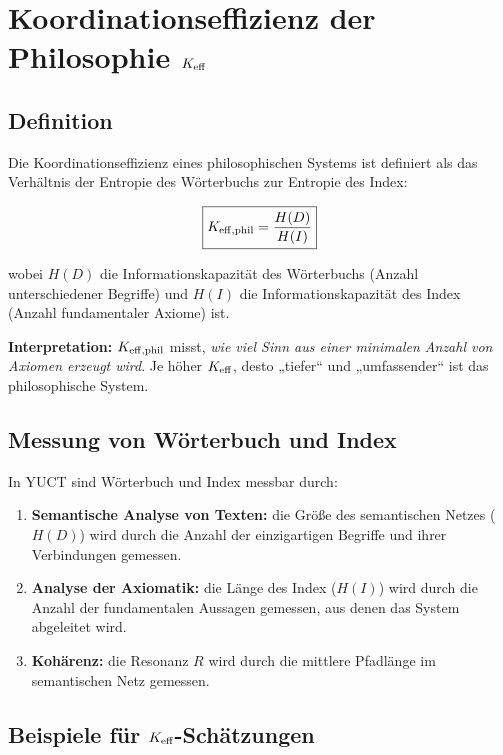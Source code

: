 \documentclass[12pt,a4paper]{article}
\begin{document}
	\section{Koordinationseffizienz der Philosophie \texorpdfstring{\(\Keff\)}{K\_eff}}
	
	\subsection{Definition}
	
	Die Koordinationseffizienz eines philosophischen Systems ist definiert als das Verhältnis der Entropie des Wörterbuchs zur Entropie des Index:
	
	\begin{equation}
		\boxed{
			\Keff[\text{phil}] = \frac{H(D)}{H(I)}
		}
		\label{eq:keff-phil}
	\end{equation}
	
	wobei \(H(D)\) die Informationskapazität des Wörterbuchs (Anzahl unterschiedener Begriffe) und \(H(I)\) die Informationskapazität des Index (Anzahl fundamentaler Axiome) ist.
	
	\textbf{Interpretation:} \(\Keff[\text{phil}]\) misst, \emph{wie viel Sinn aus einer minimalen Anzahl von Axiomen erzeugt wird}. Je höher \(\Keff\), desto „tiefer“ und „umfassender“ ist das philosophische System.
	
	\subsection{Messung von Wörterbuch und Index}
	
	In YUCT sind Wörterbuch und Index messbar durch:
	
	\begin{enumerate}
		\item \textbf{Semantische Analyse von Texten:} die Größe des semantischen Netzes (\(H(D)\)) wird durch die Anzahl der einzigartigen Begriffe und ihrer Verbindungen gemessen.
		\item \textbf{Analyse der Axiomatik:} die Länge des Index (\(H(I)\)) wird durch die Anzahl der fundamentalen Aussagen gemessen, aus denen das System abgeleitet wird.
		\item \textbf{Kohärenz:} die Resonanz \(R\) wird durch die mittlere Pfadlänge im semantischen Netz gemessen.
	\end{enumerate}
	
	\subsection{Beispiele für \texorpdfstring{\(\Keff\)}{K\_eff}-Schätzungen}
	
\end{document}

